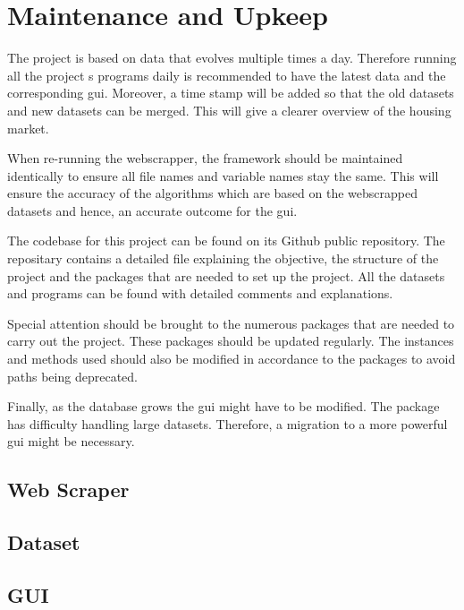 \documentclass[main]{subfiles}
\begin{document}
\section{Maintenance and Upkeep}

The project is based on data that evolves multiple times a day. 
Therefore running all the project s programs daily is recommended to have the latest data and the corresponding \ac{gui}. 
Moreover, a time stamp will be added so that the old datasets and new datasets can be merged. 
This will give a clearer overview of the housing market. \par
When re-running the webscrapper, the framework should be maintained identically to ensure all file names and variable names stay the same. 
This will ensure the accuracy of the algorithms which are based on the webscrapped datasets and hence, an accurate outcome for the \ac{gui}. \par
The codebase for this project can be found on its Github public repository. 
The repositary contains a detailed \pkg[readme.md] file explaining the objective, the structure of the project and the packages that are needed to set up the project. 
All the datasets and programs can be found with detailed comments and explanations.\par
Special attention should be brought to the numerous packages that are needed to carry out the project. 
These packages should be updated regularly. The instances and methods used should also be modified in accordance to the packages to avoid paths being deprecated.\par
Finally, as the database grows the \ac{gui} might have to be modified. The \pkg[tkinter] package has difficulty handling large datasets.
Therefore, a migration to a more powerful \ac{gui} might be necessary.


\subsection{Web Scraper}


\subsection{Dataset}

\subsection{GUI}
\end{document}
